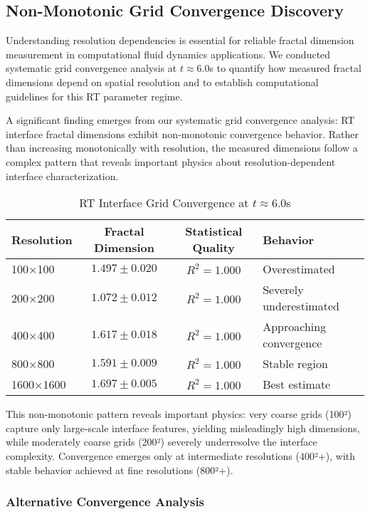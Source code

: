 \documentclass[preprint,12pt]{elsarticle}
\def\textbf#1{#1}%
\begin{document}
\subsection{Non-Monotonic Grid Convergence Discovery}
\label{subsec:grid_convergence}

Understanding resolution dependencies is essential for reliable fractal dimension measurement in computational fluid dynamics applications. We conducted systematic grid convergence analysis at $t \approx 6.0$s to quantify how measured fractal dimensions depend on spatial resolution and to establish computational guidelines for this RT parameter regime.

A significant finding emerges from our systematic grid convergence analysis: \textbf{RT interface fractal dimensions exhibit non-monotonic convergence behavior}. Rather than increasing monotonically with resolution, the measured dimensions follow a complex pattern that reveals important physics about resolution-dependent interface characterization.

\begin{table}[H]
\centering
\small
\begin{tabularx}{\textwidth}{@{}lccX@{}}
\toprule
\textbf{Resolution} & \textbf{Fractal Dimension} & \textbf{Statistical Quality} & \textbf{Behavior} \\
\midrule
100×100 & $1.497 \pm 0.020$ & $R^2 = 1.000$ & Overestimated \\
200×200 & $1.072 \pm 0.012$ & $R^2 = 1.000$ & Severely underestimated \\
400×400 & $1.617 \pm 0.018$ & $R^2 = 1.000$ & Approaching convergence \\
800×800 & $1.591 \pm 0.009$ & $R^2 = 1.000$ & Stable region \\
1600×1600 & $1.697 \pm 0.005$ & $R^2 = 1.000$ & Best estimate \\
\bottomrule
\end{tabularx}
\caption{RT Interface Grid Convergence at $t \approx 6.0$s}
\label{tab:rt_convergence}
\end{table}

This non-monotonic pattern reveals important physics: very coarse grids (100²) capture only large-scale interface features, yielding misleadingly high dimensions, while moderately coarse grids (200²) severely underresolve the interface complexity. Convergence emerges only at intermediate resolutions (400²+), with stable behavior achieved at fine resolutions (800²+).

\subsubsection{Alternative Convergence Analysis}
\end{document}

